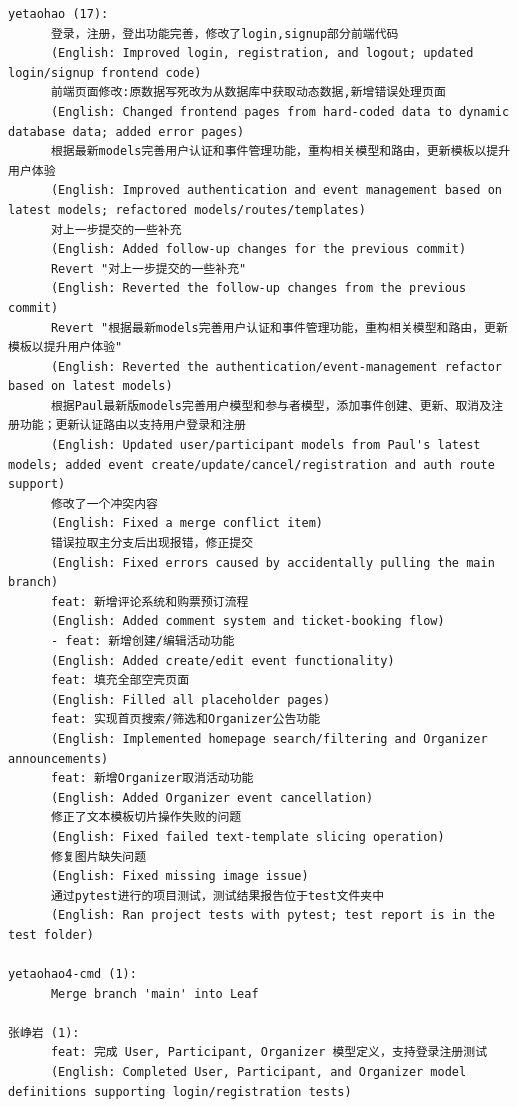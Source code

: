 \documentclass[12pt,a4paper]{article}
\begin{document}
\begin{Verbatim}[fontsize=\scriptsize,breaklines=true]
yetaohao (17):
      登录，注册，登出功能完善，修改了login,signup部分前端代码
      (English: Improved login, registration, and logout; updated login/signup frontend code)
      前端页面修改:原数据写死改为从数据库中获取动态数据,新增错误处理页面
      (English: Changed frontend pages from hard-coded data to dynamic database data; added error pages)
      根据最新models完善用户认证和事件管理功能，重构相关模型和路由，更新模板以提升用户体验
      (English: Improved authentication and event management based on latest models; refactored models/routes/templates)
      对上一步提交的一些补充
      (English: Added follow-up changes for the previous commit)
      Revert "对上一步提交的一些补充"
      (English: Reverted the follow-up changes from the previous commit)
      Revert "根据最新models完善用户认证和事件管理功能，重构相关模型和路由，更新模板以提升用户体验"
      (English: Reverted the authentication/event-management refactor based on latest models)
      根据Paul最新版models完善用户模型和参与者模型，添加事件创建、更新、取消及注册功能；更新认证路由以支持用户登录和注册
      (English: Updated user/participant models from Paul's latest models; added event create/update/cancel/registration and auth route support)
      修改了一个冲突内容
      (English: Fixed a merge conflict item)
      错误拉取主分支后出现报错，修正提交
      (English: Fixed errors caused by accidentally pulling the main branch)
      feat: 新增评论系统和购票预订流程
      (English: Added comment system and ticket-booking flow)
      - feat: 新增创建/编辑活动功能
      (English: Added create/edit event functionality)
      feat: 填充全部空壳页面
      (English: Filled all placeholder pages)
      feat: 实现首页搜索/筛选和Organizer公告功能
      (English: Implemented homepage search/filtering and Organizer announcements)
      feat: 新增Organizer取消活动功能
      (English: Added Organizer event cancellation)
      修正了文本模板切片操作失败的问题
      (English: Fixed failed text-template slicing operation)
      修复图片缺失问题
      (English: Fixed missing image issue)
      通过pytest进行的项目测试，测试结果报告位于test文件夹中
      (English: Ran project tests with pytest; test report is in the test folder)

yetaohao4-cmd (1):
      Merge branch 'main' into Leaf

张峥岩 (1):
      feat: 完成 User, Participant, Organizer 模型定义，支持登录注册测试
      (English: Completed User, Participant, and Organizer model definitions supporting login/registration tests)
\end{Verbatim}
\end{document}
